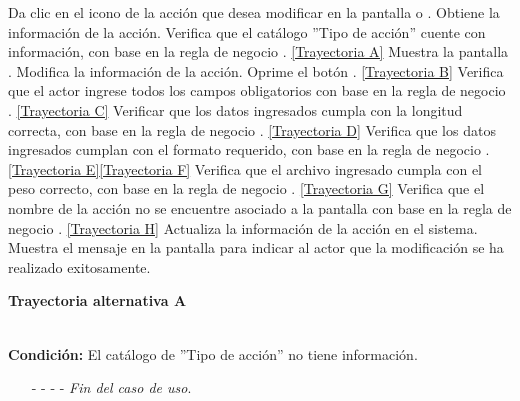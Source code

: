 \begin{UCtrayectoria}
	\UCpaso[\UCactor] Da clic en el icono \editar de la acción que desea modificar en la pantalla  o .
	\UCpaso[\UCsist] Obtiene la información de la acción.
	\UCpaso[\UCsist] Verifica que el catálogo ''Tipo de acción'' cuente con información, con base en la regla de negocio . \hyperlink{CU11-1-1-2:TAA}{[Trayectoria A]}
	\UCpaso[\UCsist] Muestra la pantalla .
	\UCpaso[\UCactor] Modifica la información de la acción. \label{CU11.1.2-P4}
	\UCpaso[\UCactor] Oprime el botón . \hyperlink{CU11-1-1-2:TAB}{[Trayectoria B]} 
	\UCpaso[\UCsist] Verifica que el actor ingrese todos los campos obligatorios con base en la regla de negocio . \hyperlink{CU11-1-1-2:TAC}{[Trayectoria C]}
	\UCpaso[\UCsist] Verificar que los datos ingresados cumpla con la longitud correcta, con base en la regla de negocio . \hyperlink{CU11-1-1-2:TAD}{[Trayectoria D]}
	\UCpaso[\UCsist] Verifica que los datos ingresados cumplan con el formato requerido, con base en la regla de negocio . \hyperlink{CU11-1-1-2:TAE}{[Trayectoria E]}\hyperlink{CU11-1-1-2:TAF}{[Trayectoria F]}
	\UCpaso[\UCsist] Verifica que el archivo ingresado cumpla con el peso correcto, con base en la regla de negocio . \hyperlink{CU11-1-1-2:TAG}{[Trayectoria G]}
	\UCpaso[\UCsist] Verifica que el nombre de la acción no se encuentre asociado a la pantalla con base en la regla de negocio . \hyperlink{CU11-1-1-2:TAH}{[Trayectoria H]} 
	\UCpaso[\UCsist] Actualiza la información de la acción en el sistema.
	\UCpaso[\UCsist] Muestra el mensaje  en la pantalla  para indicar al actor que la modificación se ha realizado exitosamente.
\end{UCtrayectoria}		
\hypertarget{CU11-1-1-2:TAA}{\textbf{Trayectoria alternativa A}}\\
\noindent \textbf{Condición:} El catálogo de ''Tipo de acción'' no tiene información.
\begin{enumerate}
	\UCpaso[\UCsist] Muestra el mensaje  en la pantalla  para indicar que no es posible realizar la operación debido a la falta de información necesaria para el sistema.
	\item[- -] - - {\em {Fin del caso de uso}}.%
\end{enumerate}
